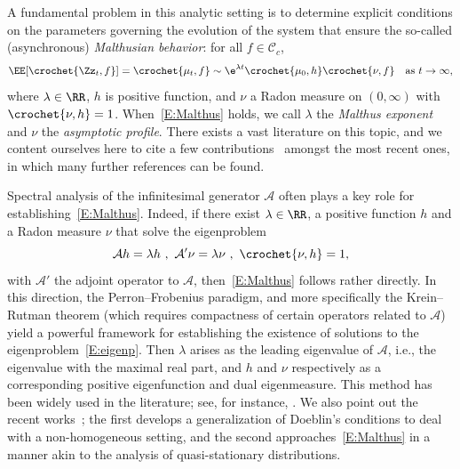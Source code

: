A fundamental problem in this analytic setting is to determine explicit conditions on the parameters governing the evolution of the system that ensure the so-called (asynchronous) \emph{Malthusian behavior}: for all $f\in{\mathcal C}_c$,
\begin{equation}\label{E:Malthus}
\EE[\crochet{ \Zz_t,f}]=\crochet{\mu_t,f} \sim \e^{\lambda t}\crochet{\mu_0,h } \crochet{\nu,f}\quad \text{as }t \to \infty,
\end{equation}
where $\lambda \in \RR$, $h$ is positive function, and $\nu$ a Radon measure on $(0,\infty)$ with $\crochet{\nu,h }=1$. When~\eqref{E:Malthus} holds, we call $\lambda$ the \emph{Malthus exponent} and $\nu$ the \emph{asymptotic profile}. There exists a vast literature on this topic, and we content ourselves here to cite a few contributions~\cite{BerGab2, CalvoDoumicPerthame, DDGW, Esco} amongst the most recent ones, in which many further references can be found.

Spectral analysis of the infinitesimal generator ${\mathcal A}$ often plays a key role for establishing~\eqref{E:Malthus}. Indeed, if there exist $\lambda \in \RR$, a positive function $h$ and a Radon measure $\nu$ that solve the eigenproblem
\begin{equation}\label{E:eigenp}
{\mathcal A}h =\lambda h \ ,\ {\mathcal A}'\nu =\lambda \nu\ ,\
\crochet{\nu,h }=1,
\end{equation}
with $\mathcal{A}'$ the adjoint operator to $\mathcal{A}$, then~\eqref{E:Malthus} follows rather directly. In this direction, the Perron--Frobenius paradigm, and more specifically the Krein--Rutman theorem (which requires compactness of certain operators related to ${\mathcal A}$) yield a powerful framework for establishing the existence of solutions to the eigenproblem~\eqref{E:eigenp}. Then $\lambda$ arises as the leading eigenvalue of ${\mathcal A}$, i.e., the eigenvalue with the maximal real part, and $h$ and $\nu$ respectively as a corresponding positive eigenfunction and dual eigenmeasure. This method has been widely used in the literature; see, for instance, \cite{BCG-fine,DoumGab, MS16,Per07}. We also point out the recent works~\cite{BanCloGab, BCGM-qs}; the first develops a generalization of Doeblin's conditions to deal with a non-homogeneous setting, and the second approaches~\eqref{E:Malthus} in a manner akin to the analysis of quasi-stationary distributions.

